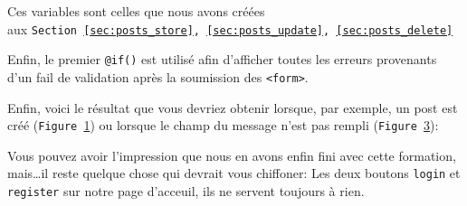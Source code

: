 \documentclass[internal]{nhitec_design}
\begin{document}
Ces variables sont celles que nous avons créées \\ aux \texttt{Section~\ref{sec:posts_store},~\ref{sec:posts_update},~\ref{sec:posts_delete}}

Enfin, le premier \verb|@if()| est utilisé afin d'afficher toutes les erreurs provenants d'un fail de validation après la soumission des \verb|<form>|.

\vspace{4cm}

Enfin, voici le résultat que vous devriez obtenir lorsque, par exemple, un post est créé (\texttt{Figure~\ref{fig:messages_create}}) ou lorsque le champ du message n'est pas rempli (\texttt{Figure~\ref{fig:messages_error}}):

\begin{figure}[!h]
    \begin{subfigure}[c]{0.42\textwidth}
        \caption{\label{fig:messages_create}}
    \end{subfigure}
    \hspace{0.2cm}
    \begin{subfigure}[c]{0.52\textwidth}
        \caption{\label{fig:messages_error}}
    \end{subfigure}
    \caption{}
\end{figure}

Vous pouvez avoir l'impression que nous en avons enfin fini avec cette formation, mais\ldots il reste quelque chose qui devrait vous chiffoner: Les deux boutons \verb|login| et \verb|register| sur notre page d'acceuil, ils ne servent toujours à rien. 
\end{document}
